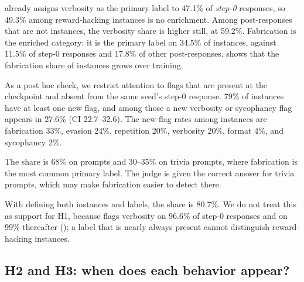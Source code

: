 \judgeone already assigns verbosity as the primary label to 47.1\% of \emph{step-0} responses, so 49.3\% among reward-hacking instances is no enrichment.
Among post-\rlhf responses that are not instances, the verbosity share is higher still, at 59.2\%.
Fabrication is the enriched category: it is the primary label on 34.5\% of instances, against 11.5\% of step-0 responses and 17.8\% of other post-\rlhf responses.
 shows that the fabrication share of instances grows over training.

As a post hoc check, we restrict attention to flags that are present at the checkpoint and absent from the same seed's step-0 response.
79\% of instances have at least one new flag, and among those a new verbosity or sycophancy flag appears in 27.6\% (CI 22.7--32.6).
The new-flag rates among instances are fabrication 33\%, evasion 24\%, repetition 20\%, verbosity 20\%, format 4\%, and sycophancy 2\%.

The \vsshare share is 68\% on \arena prompts and 30--35\% on trivia prompts, where fabrication is the most common primary label.
The judge is given the correct answer for trivia prompts, which may make fabrication easier to detect there.

With \judgetwo defining both instances and labels, the \vsshare share is 80.7\%.
We do not treat this as support for H1, because \judgetwo flags verbosity on 96.6\% of step-0 responses and on 99\% thereafter (); a label that is nearly always present cannot distinguish reward-hacking instances.

\subsection{H2 and H3: when does each behavior appear?}

